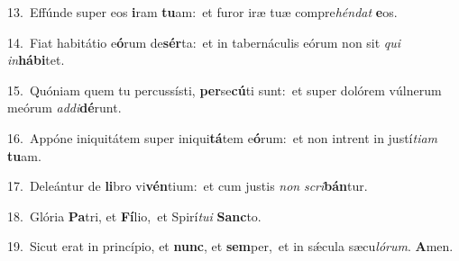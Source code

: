 {\numbfont\textcolor{\numbcolor}{13.}}~Effúnde super eos \textbf{i}\-ram \textbf{tu}\-am:~\star et furor iræ tuæ compre\-\textit{hén}\-\textit{dat} \textbf{e}\-os.\par
{\numbfont\textcolor{\numbcolor}{14.}}~Fiat habitátio e\-\textbf{ó}\-rum de\-\textbf{sér}\-ta:~\star et in tabernáculis eórum non sit \textit{qui} \textit{in}\-\textbf{há}\textbf{bi}tet.\par
{\numbfont\textcolor{\numbcolor}{15.}}~Quóniam quem tu percussísti, \textbf{per}\-se\-\textbf{cú}\-ti sunt:~\star et super dolórem vúlnerum meórum \textit{ad}\-\textit{di}\textbf{dé}runt.\par
{\numbfont\textcolor{\numbcolor}{16.}}~Appóne iniquitátem super iniqui\-\textbf{tá}\-tem e\-\textbf{ó}\-rum:~\star et non intrent in justí\-\textit{ti}\-\textit{am} \textbf{tu}\-am.\par
{\numbfont\textcolor{\numbcolor}{17.}}~Deleántur de \textbf{li}\-bro vi\-\textbf{vén}\-tium:~\star et cum justis \textit{non} \textit{scri}\-\textbf{bán}tur.\par
{\numbfont\textcolor{\numbcolor}{18.}}~Glória \textbf{Pa}\-tri, et \textbf{Fí}\-lio,~\star et Spirí\-\textit{tu}\-\textit{i} \textbf{Sanc}\-to.\par
{\numbfont\textcolor{\numbcolor}{19.}}~Sicut erat in princípio, et \textbf{nunc}\-, et \textbf{sem}\-per,~\star et in sǽcula sæcu\-\textit{ló}\-\textit{rum}. \textbf{A}\-men.\par
